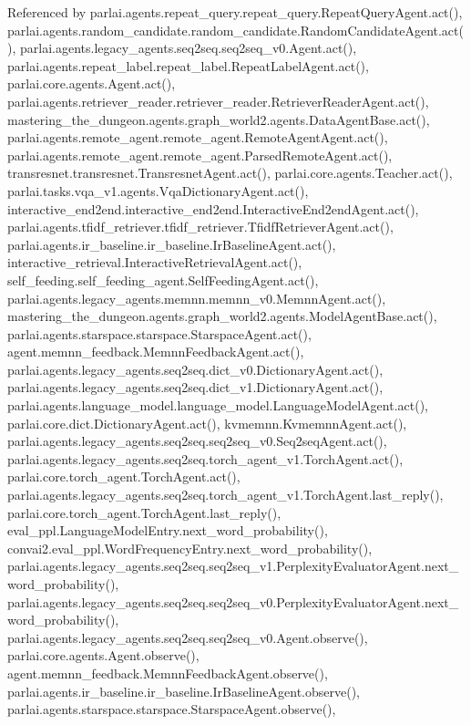Referenced by parlai.\+agents.\+repeat\+\_\+query.\+repeat\+\_\+query.\+Repeat\+Query\+Agent.\+act(), parlai.\+agents.\+random\+\_\+candidate.\+random\+\_\+candidate.\+Random\+Candidate\+Agent.\+act(), parlai.\+agents.\+legacy\+\_\+agents.\+seq2seq.\+seq2seq\+\_\+v0.\+Agent.\+act(), parlai.\+agents.\+repeat\+\_\+label.\+repeat\+\_\+label.\+Repeat\+Label\+Agent.\+act(), parlai.\+core.\+agents.\+Agent.\+act(), parlai.\+agents.\+retriever\+\_\+reader.\+retriever\+\_\+reader.\+Retriever\+Reader\+Agent.\+act(), mastering\+\_\+the\+\_\+dungeon.\+agents.\+graph\+\_\+world2.\+agents.\+Data\+Agent\+Base.\+act(), parlai.\+agents.\+remote\+\_\+agent.\+remote\+\_\+agent.\+Remote\+Agent\+Agent.\+act(), parlai.\+agents.\+remote\+\_\+agent.\+remote\+\_\+agent.\+Parsed\+Remote\+Agent.\+act(), transresnet.\+transresnet.\+Transresnet\+Agent.\+act(), parlai.\+core.\+agents.\+Teacher.\+act(), parlai.\+tasks.\+vqa\+\_\+v1.\+agents.\+Vqa\+Dictionary\+Agent.\+act(), interactive\+\_\+end2end.\+interactive\+\_\+end2end.\+Interactive\+End2end\+Agent.\+act(), parlai.\+agents.\+tfidf\+\_\+retriever.\+tfidf\+\_\+retriever.\+Tfidf\+Retriever\+Agent.\+act(), parlai.\+agents.\+ir\+\_\+baseline.\+ir\+\_\+baseline.\+Ir\+Baseline\+Agent.\+act(), interactive\+\_\+retrieval.\+Interactive\+Retrieval\+Agent.\+act(), self\+\_\+feeding.\+self\+\_\+feeding\+\_\+agent.\+Self\+Feeding\+Agent.\+act(), parlai.\+agents.\+legacy\+\_\+agents.\+memnn.\+memnn\+\_\+v0.\+Memnn\+Agent.\+act(), mastering\+\_\+the\+\_\+dungeon.\+agents.\+graph\+\_\+world2.\+agents.\+Model\+Agent\+Base.\+act(), parlai.\+agents.\+starspace.\+starspace.\+Starspace\+Agent.\+act(), agent.\+memnn\+\_\+feedback.\+Memnn\+Feedback\+Agent.\+act(), parlai.\+agents.\+legacy\+\_\+agents.\+seq2seq.\+dict\+\_\+v0.\+Dictionary\+Agent.\+act(), parlai.\+agents.\+legacy\+\_\+agents.\+seq2seq.\+dict\+\_\+v1.\+Dictionary\+Agent.\+act(), parlai.\+agents.\+language\+\_\+model.\+language\+\_\+model.\+Language\+Model\+Agent.\+act(), parlai.\+core.\+dict.\+Dictionary\+Agent.\+act(), kvmemnn.\+Kvmemnn\+Agent.\+act(), parlai.\+agents.\+legacy\+\_\+agents.\+seq2seq.\+seq2seq\+\_\+v0.\+Seq2seq\+Agent.\+act(), parlai.\+agents.\+legacy\+\_\+agents.\+seq2seq.\+torch\+\_\+agent\+\_\+v1.\+Torch\+Agent.\+act(), parlai.\+core.\+torch\+\_\+agent.\+Torch\+Agent.\+act(), parlai.\+agents.\+legacy\+\_\+agents.\+seq2seq.\+torch\+\_\+agent\+\_\+v1.\+Torch\+Agent.\+last\+\_\+reply(), parlai.\+core.\+torch\+\_\+agent.\+Torch\+Agent.\+last\+\_\+reply(), eval\+\_\+ppl.\+Language\+Model\+Entry.\+next\+\_\+word\+\_\+probability(), convai2.\+eval\+\_\+ppl.\+Word\+Frequency\+Entry.\+next\+\_\+word\+\_\+probability(), parlai.\+agents.\+legacy\+\_\+agents.\+seq2seq.\+seq2seq\+\_\+v1.\+Perplexity\+Evaluator\+Agent.\+next\+\_\+word\+\_\+probability(), parlai.\+agents.\+legacy\+\_\+agents.\+seq2seq.\+seq2seq\+\_\+v0.\+Perplexity\+Evaluator\+Agent.\+next\+\_\+word\+\_\+probability(), parlai.\+agents.\+legacy\+\_\+agents.\+seq2seq.\+seq2seq\+\_\+v0.\+Agent.\+observe(), parlai.\+core.\+agents.\+Agent.\+observe(), agent.\+memnn\+\_\+feedback.\+Memnn\+Feedback\+Agent.\+observe(), parlai.\+agents.\+ir\+\_\+baseline.\+ir\+\_\+baseline.\+Ir\+Baseline\+Agent.\+observe(), parlai.\+agents.\+starspace.\+starspace.\+Starspace\+Agent.\+observe(), 